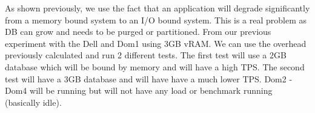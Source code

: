 \indent As shown previously, we use the fact that an application will degrade significantly from a memory bound system to an I/O bound system.  This is a real problem as DB can grow and needs to be purged or partitioned.  From our previous experiment with the Dell and Dom1 using 3GB vRAM.  We can use the overhead previously calculated and run 2 different tests.  The first test will use a 2GB database which will be bound by memory and will have a high TPS. The second test will have a 3GB database and will have have a much lower TPS.  Dom2 - Dom4 will be running but will not have any load or benchmark running (basically idle).

